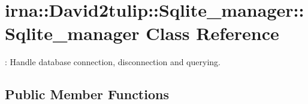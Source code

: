\hypertarget{classirna_1_1David2tulip_1_1Sqlite__manager_1_1Sqlite__manager}{
\section{irna\-:\-:\-David2tulip\-:\-:\-Sqlite\-\_\-manager\-:\-:\-Sqlite\-\_\-manager \-Class \-Reference}
\label{classirna_1_1David2tulip_1_1Sqlite__manager_1_1Sqlite__manager}
}


\-: \-Handle database connection, disconnection and querying.  


\subsection*{\-Public \-Member \-Functions}
